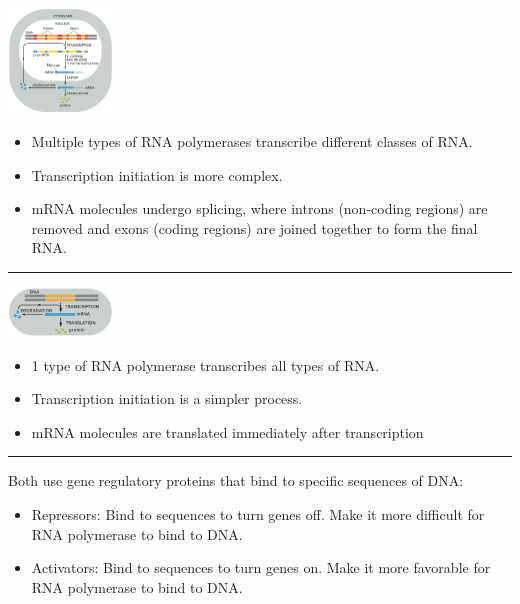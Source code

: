 
\begin{minipage}{0.32\linewidth}
    \includegraphics[width=28mm]{src/Images/eukaryot_transcription.png}\\ 
\end{minipage}
\begin{minipage}{0.68\linewidth}
\begin{itemize}
    \item Multiple types of RNA polymerases transcribe different classes of RNA.
    \item Transcription initiation is more complex.
    \item mRNA molecules undergo splicing, where introns (non-coding regions) are removed and exons (coding regions) are joined together to form the final RNA.
\end{itemize}
\end{minipage}
\hrule
\vspace{2mm}
\begin{minipage}{0.32\linewidth}
    \includegraphics[width=28mm]{src/Images/prokaryot_transcription.png}\\ 
\end{minipage}
\begin{minipage}{0.68\linewidth}
\begin{itemize}
    \item 1 type of RNA polymerase transcribes all types of RNA.
    \item Transcription initiation is a simpler process.
    \item mRNA molecules are translated immediately after
transcription
\end{itemize}
\end{minipage}
\hrule
\vspace{2mm}
Both use gene regulatory proteins that bind to
specific sequences of DNA:
\begin{itemize}
    \item Repressors: Bind to sequences to turn genes off. Make it more difficult for RNA polymerase to bind to DNA.
    \item Activators: Bind to sequences to turn genes on. Make it more favorable for RNA polymerase to bind to DNA.
\end{itemize}
